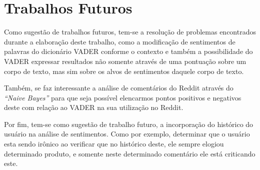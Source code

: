\section{Trabalhos Futuros}

Como sugestão de trabalhos futuros, tem-se a resolução de problemas encontrados
durante a elaboração deste trabalho, como a modificação de sentimentos de palavras do dicionário
\ac{VADER} conforme o contexto e também a possibilidade do \ac{VADER} expressar
resultados não somente através de uma pontuação sobre um corpo de texto, mas sim
sobre os alvos de sentimentos daquele corpo de texto.

Também, se faz interessante a análise de comentários do Reddit através do
\textit{``Naive Bayes''} para que seja possível elencarmos pontos positivos e
negativos deste com relação ao \ac{VADER} na sua utilização no Reddit.

Por fim, tem-se como sugestão de trabalho futuro, a incorporação do histórico do
usuário na análise de sentimentos. Como por exemplo, determinar que o usuário
esta sendo irônico ao verificar que no histórico deste, ele sempre elogiou
determinado produto, e somente neste determinado comentário ele está criticando
este.
